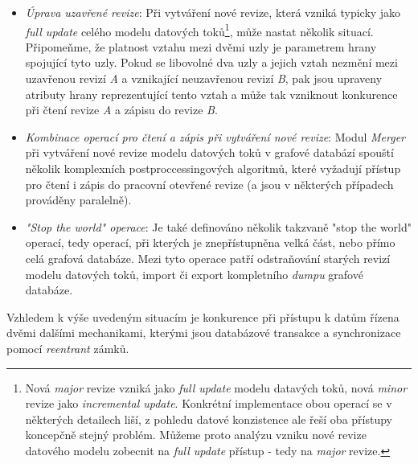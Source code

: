 \begin{itemize}
	\item{\textit{Úprava uzavřené revize}}: Při vytváření nové revize, která vzniká typicky jako \textit{full update} celého modelu datových toků\footnote{Nová \textit{major} revize vzniká jako \textit{full update} modelu datavých toků, nová \textit{minor} revize jako \textit{incremental update}. Konkrétní implementace obou operací se v některých detailech liší, z pohledu datové konzistence ale řeší oba přístupy koncepčně stejný problém. Můžeme proto analýzu vzniku nové revize datového modelu zobecnit na \textit{full update} přístup - tedy na \textit{major} revize.}, může nastat několik situací. Připomeňme, že platnost vztahu mezi dvěmi uzly je parametrem hrany spojující tyto uzly. Pokud se libovolné dva uzly a jejich vztah nezmění mezi uzavřenou revizí \textit{A} a vznikající neuzavřenou revizí \textit{B}, pak jsou upraveny atributy hrany reprezentující tento vztah a může tak vzniknout konkurence při čtení revize \textit{A} a zápisu do revize \textit{B}.
	\item{\textit{Kombinace operací pro čtení a zápis při vytváření nové revize}}: Modul \textit{Merger} při vytváření nové revize modelu datových toků v grafové databází spouští několik komplexních postproccessingových algoritmů, které vyžadují přístup pro čtení i zápis do pracovní otevřené revize (a jsou v některých případech prováděny paralelně).
	\item{\textit{"Stop the world" operace}}: Je také definováno několik takzvaně "stop the world" operací, tedy operací, při kterých je znepřístupněna velká část, nebo přímo celá grafová databáze. Mezi tyto operace patří odstraňování starých revizí modelu datových toků, import či export kompletního \textit{dumpu} grafové databáze.
\end{itemize}

Vzhledem k výše uvedeným situacím je konkurence při přístupu k datům řízena dvěmi dalšími mechanikami, kterými jsou databázové transakce a synchronizace pomocí \textit{reentrant} zámků.

